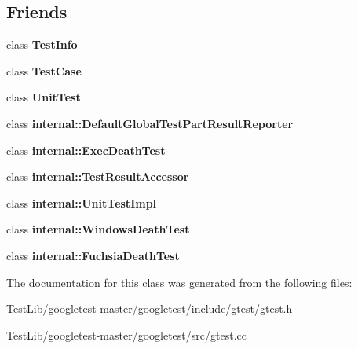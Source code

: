 \subsection*{Friends}
\begin{DoxyCompactItemize}
\item 
\mbox{\label{classtesting_1_1TestResult_a4c49c2cdb6c328e6b709b4542f23de3c}} 
class {\bfseries Test\+Info}
\item 
\mbox{\label{classtesting_1_1TestResult_aff779e55b06adfa7c0088bd10253f0f0}} 
class {\bfseries Test\+Case}
\item 
\mbox{\label{classtesting_1_1TestResult_a832b4d233efee1a32feb0f4190b30d39}} 
class {\bfseries Unit\+Test}
\item 
\mbox{\label{classtesting_1_1TestResult_abae39633da9932847b41cb80efd62115}} 
class {\bfseries internal\+::\+Default\+Global\+Test\+Part\+Result\+Reporter}
\item 
\mbox{\label{classtesting_1_1TestResult_adf5553cae6aea6f8648d47e299237e34}} 
class {\bfseries internal\+::\+Exec\+Death\+Test}
\item 
\mbox{\label{classtesting_1_1TestResult_ae762da04e74a0d3b0daded3c5bd4a8e8}} 
class {\bfseries internal\+::\+Test\+Result\+Accessor}
\item 
\mbox{\label{classtesting_1_1TestResult_acc0a5e7573fd6ae7ad1878613bb86853}} 
class {\bfseries internal\+::\+Unit\+Test\+Impl}
\item 
\mbox{\label{classtesting_1_1TestResult_a6aeedc04a0590fcc1b3c5f687dbb0f9f}} 
class {\bfseries internal\+::\+Windows\+Death\+Test}
\item 
\mbox{\label{classtesting_1_1TestResult_af29d5921f68031cdfba0b28cf4b3b559}} 
class {\bfseries internal\+::\+Fuchsia\+Death\+Test}
\end{DoxyCompactItemize}


The documentation for this class was generated from the following files\+:\begin{DoxyCompactItemize}
\item 
Test\+Lib/googletest-\/master/googletest/include/gtest/gtest.\+h\item 
Test\+Lib/googletest-\/master/googletest/src/gtest.\+cc\end{DoxyCompactItemize}

